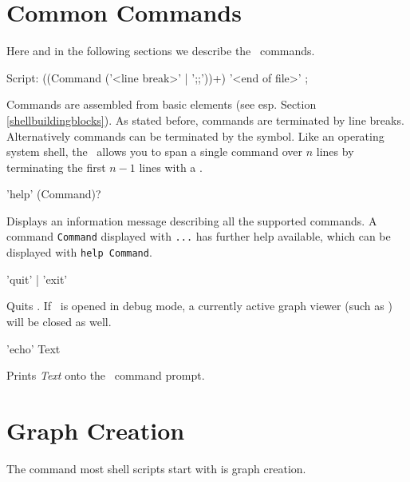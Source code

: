 \section{Common Commands}
\label{commcommands}

Here and in the following sections we describe the \GrShell\ commands.

\begin{rail}
  Script: ((Command ('<line break>' | ';;'))+) '<end of file>' ;
\end{rail}
Commands are assembled from basic elements (see esp. Section \ref{shellbuildingblocks}).
As stated before, commands are terminated by line breaks.
Alternatively commands can be terminated by the \indexed{\texttt{;;}} symbol.
Like an operating system shell, the \GrShell\ allows you to span a single command over $n$ lines by terminating the first $n-1$ lines with a .

\begin{rail}
  'help' (Command)?
\end{rail}
Displays an information message describing all the supported commands.
A command \texttt{Command} displayed with \texttt{...} has further help available, which can be displayed with \texttt{help Command}.

\begin{rail}
  'quit' | 'exit'
\end{rail}
Quits \GrShell. If \GrShell\ is opened in debug mode, a currently active graph viewer (such as \yComp) will be closed as well.

\begin{rail}
  'echo' Text
\end{rail}
Prints \emph{Text} onto the \GrShell\ command prompt.


\section{Graph Creation}
\label{graphcreationcommands}

The command most shell scripts start with is graph creation.

